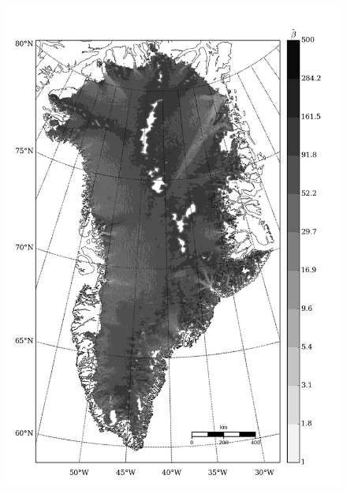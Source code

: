 \begin{figure}
  \centering
  \begin{minipage}[b]{0.47\linewidth}
    \includegraphics[width=1.0\textwidth]{images/greenland/stats/GLM_beta_no_uvw.jpg}
  \end{minipage}
  \quad
  \begin{minipage}[b]{0.47\linewidth}

\end{minipage}
\end{figure}
